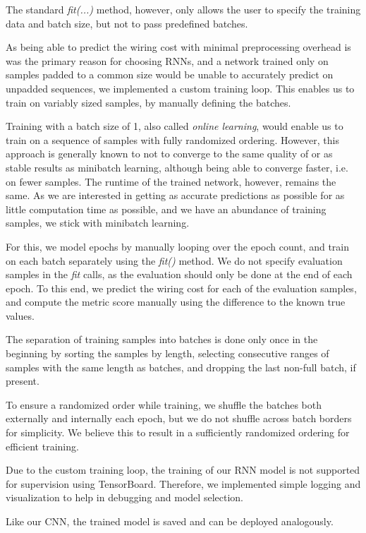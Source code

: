 The standard \textit{fit(...)} method, however, only allows the user to specify the training data and batch size, but not to pass predefined batches.

As being able to predict the wiring cost with minimal preprocessing overhead is was the primary reason for choosing \glspl{RNN}, and a network trained only on samples padded to a common size would be unable to accurately predict on unpadded sequences, we implemented a custom training loop. This enables us to train on variably sized samples, by manually defining the batches.

Training with a batch size of 1, also called \textit{online learning}, would enable us to train on a sequence of samples with fully randomized ordering. However, this approach is generally known to not to converge to the same quality of or as stable results as minibatch learning, although being able to converge faster, i.e. on fewer samples. The runtime of the trained network, however, remains the same. As we are interested in getting as accurate predictions as possible for as little computation time as possible, and we have an abundance of training samples, we stick with minibatch learning.

For this, we model epochs by manually looping over the epoch count, and train on each batch separately using the \textit{fit()} method. We do not specify evaluation samples in the \textit{fit} calls, as the evaluation should only be done at the end of each epoch. To this end, we predict the wiring cost for each of the evaluation samples, and compute the metric score manually using the difference to the known true values.

The separation of training samples into batches is done only once in the beginning by sorting the samples by length, selecting consecutive ranges of samples with the same length as batches, and dropping the last non-full batch, if present.

To ensure a randomized order while training, we shuffle the batches both externally and internally each epoch, but we do not shuffle across batch borders for simplicity. We believe this to result in a sufficiently randomized ordering for efficient training.

Due to the custom training loop, the training of our \gls{RNN} model is not supported for supervision using TensorBoard. Therefore, we implemented simple logging and visualization to help in debugging and model selection.

Like our \gls{CNN}, the trained model is saved and can be deployed analogously.


